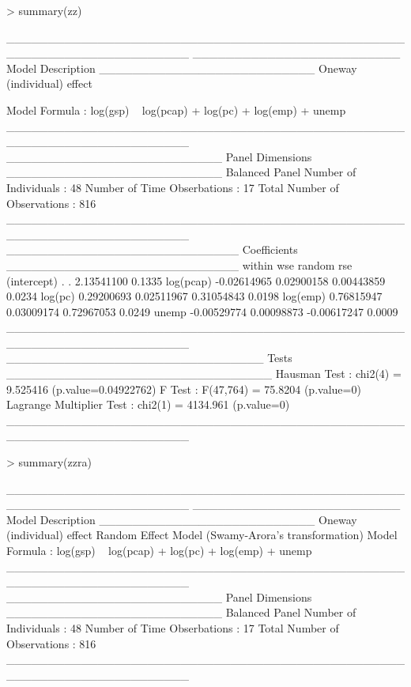 \documentclass[a4paper]{article}
\begin{document}
\begin{Schunk}
\begin{Sinput}
> summary(zz)
\end{Sinput}
\begin{Soutput}
______________________________________________________________________ 
_________________________ Model Description __________________________
Oneway (individual) effect

Model Formula        : log(gsp) ~ log(pcap) + log(pc) + log(emp) + 
                           unemp
______________________________________________________________________ 
__________________________ Panel Dimensions __________________________
Balanced Panel
Number of Individuals        :  48
Number of Time Obserbations  :  17
Total Number of Observations :  816
______________________________________________________________________ 
____________________________ Coefficients ____________________________
                 within         wse      random    rse
(intercept)           .           .  2.13541100 0.1335
log(pcap)   -0.02614965  0.02900158  0.00443859 0.0234
log(pc)      0.29200693  0.02511967  0.31054843 0.0198
log(emp)     0.76815947  0.03009174  0.72967053 0.0249
unemp       -0.00529774  0.00098873 -0.00617247 0.0009
______________________________________________________________________ 
_______________________________ Tests ________________________________
Hausman Test                   : chi2(4) = 9.525416 (p.value=0.04922762)
F Test                         : F(47,764) = 75.8204 (p.value=0)
Lagrange Multiplier Test       : chi2(1) = 4134.961 (p.value=0)
______________________________________________________________________ 
\end{Soutput}
\begin{Sinput}
> summary(zzra)
\end{Sinput}
\begin{Soutput}
______________________________________________________________________ 
_________________________ Model Description __________________________
Oneway (individual) effect
Random Effect Model (Swamy-Arora's transformation)
Model Formula             : log(gsp) ~ log(pcap) + log(pc) + 
                                log(emp) + unemp
______________________________________________________________________ 
__________________________ Panel Dimensions __________________________
Balanced Panel
Number of Individuals        :  48
Number of Time Obserbations  :  17
Total Number of Observations :  816
______________________________________________________________________ 

\end{Soutput}
\end{Schunk}
\end{document}
